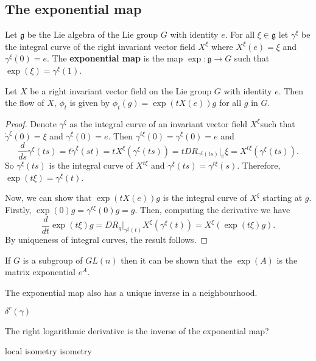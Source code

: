 \subsection{The exponential map}

\begin{definition}
  Let  \(\mathfrak{g}\) be the Lie algebra of the Lie group  \(G\) with identity  \(e\). For all  \(\xi \in \mathfrak{g}\) let  \(\gamma^{\xi}\) be the integral curve of the right invariant vector field  \(X^{\xi}\) where  \(X^\xi (e)=\xi\) and  \(\gamma^\xi(0) = e\). The \textbf{exponential map} is the map  \(\exp : \mathfrak{g} \rightarrow G\) such that  \(\exp(\xi) = \gamma^\xi(1)\).
\end{definition}
\begin{proposition}
  Let  \(X\) be a right invariant vector field on the Lie group  \(G\) with identity  \(e\). Then the flow of  \(X\),  \(\phi_t\) is given by  \(\phi_t(g) = \exp(tX(e))g\) for all  \(g\) in  \(G\).
\end{proposition}
\begin{proof}
  Denote  \(\gamma^{\xi}\) as the integral curve of an  invariant vector field  \(X^{\xi}\)such that  \(\dot{\gamma}^{\xi}(0) = \xi \) and  \(\gamma^\xi(0)=e\). Then  \(\gamma^{t\xi}(0) =  \gamma^{\xi}(0)=e\) and
  \begin{equation*}
    \frac{d}{ds}\gamma^{\xi}(ts) = t\dot\gamma^{\xi}(st)=tX^\xi(\gamma^{\xi}(ts)) = t D R_{\gamma^\xi(ts)} \vert_{e} \xi = X^{t\xi}(\gamma^{\xi}(ts)).
  \end{equation*}
  So  \(\gamma^\xi(ts)\) is the integral curve of  \(X^{t\xi}\) and  \(\gamma^\xi(ts)=\gamma^{t\xi}(s)\). Therefore,   \(\exp(t\xi) = \gamma^{\xi}(t)\).

  Now, we can show that  \(\exp(tX(e))g\) is the integral curve of  \(X^{\xi}\) starting at  \(g\). Firstly,  \(\exp(0)g = \gamma^{t\xi}(0)g=g\). Then, computing the derivative we have
  \begin{equation*}
    \frac{d}{dt} \exp(t\xi)g = D R_g \vert_{\gamma^\xi(t)} X^\xi(\gamma^\xi(t)) = X^\xi(\exp(t\xi)g).
  \end{equation*}
  By uniqueness of integral curves, the result follows.
\end{proof}
\begin{remark}
  If  \(G\) is a subgroup of  \(GL(n)\) then it can be shown that the  \(\exp(A)\) is the matrix exponential  \(e^{A}\).
\end{remark}


The exponential map also has a unique inverse in a neighbourhood.
\begin{definition}
  \(\delta^r(\gamma)\)
\end{definition}
\begin{proposition}
  The right logarithmic derivative is the inverse of the exponential map?
\end{proposition}
local isometry
isometry



